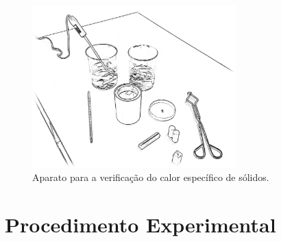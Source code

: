 \begin{figure}[!hbt]
	\centering
	\forcerectofloat
	\includegraphics[width=0.7\textwidth]{Ilustrations/AparatoCalorEspecifico}
	\caption{Aparato para a verificação do calor específico de sólidos.}
\end{figure}

\section{Procedimento Experimental}

